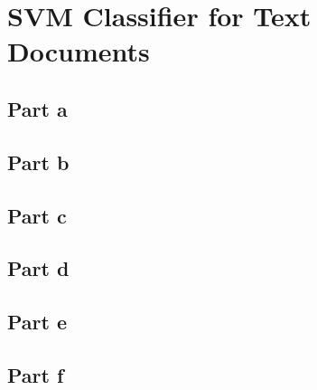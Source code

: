 \documentclass[paper=a4, fontsize=11pt]{scrartcl} %
\numberwithin{equation}{section} %
\numberwithin{figure}{section} %
\numberwithin{table}{section} %
\begin{document}
	
	
	\section{SVM Classifier for Text Documents}
	
	\subsection{Part a}

	\subsection{Part b}
	
	\subsection{Part c}
	
	\subsection{Part d}
	
	\subsection{Part e}
	
	\subsection{Part f}
	
\end{document}
